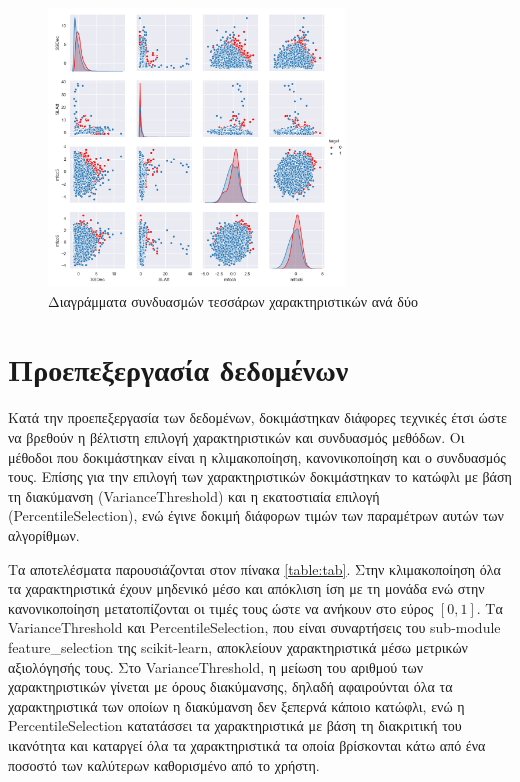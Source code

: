 \begin{figure}[h]
\centering
\includegraphics[width=0.7\textwidth]{res/figure_1.png}
\caption{Διαγράμματα συνδυασμών τεσσάρων χαρακτηριστικών ανά δύο}
\label{featureTable:table1}
\end{figure}

\section{Προεπεξεργασία δεδομένων}

Κατά την προεπεξεργασία των δεδομένων, δοκιμάστηκαν διάφορες τεχνικές έτσι ώστε να βρεθούν η βέλτιστη επιλογή χαρακτηριστικών και συνδυασμός μεθόδων. Οι μέθοδοι που δοκιμάστηκαν είναι η κλιμακοποίηση, κανονικοποίηση και ο συνδυασμός τους. Επίσης για την επιλογή των χαρακτηριστικών δοκιμάστηκαν το κατώφλι με βάση τη διακύμανση (VarianceThreshold) και η εκατοστιαία επιλογή (PercentileSelection), ενώ έγινε δοκιμή διάφορων τιμών των παραμέτρων αυτών των αλγορίθμων.

Τα αποτελέσματα παρουσιάζονται στον πίνακα \ref{table:tab}. Στην κλιμακοποίηση όλα τα χαρακτηριστικά έχουν μηδενικό μέσο και απόκλιση ίση με τη μονάδα ενώ στην κανονικοποίηση μετατοπίζονται οι τιμές τους ώστε να ανήκουν στο εύρος $[0,1]$. Τα VarianceThreshold και PercentileSelection, που είναι συναρτήσεις του sub-module feature\_selection της scikit-learn, αποκλείουν χαρακτηριστικά μέσω μετρικών αξιολόγησής τους. Στο VarianceThreshold, η μείωση του αριθμού των χαρακτηριστικών γίνεται με όρους διακύμανσης, δηλαδή αφαιρούνται όλα τα χαρακτηριστικά των οποίων η διακύμανση δεν ξεπερνά κάποιο κατώφλι, ενώ η PercentileSelection κατατάσσει τα χαρακτηριστικά με βάση τη διακριτική του ικανότητα και καταργεί όλα τα χαρακτηριστικά τα οποία βρίσκονται κάτω από ένα ποσοστό των καλύτερων καθορισμένο από το χρήστη.

